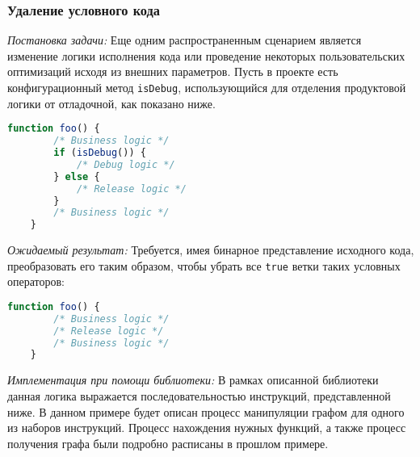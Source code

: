 \subsubsection{Удаление условного кода}

\textit{Постановка задачи:} Еще одним распространенным сценарием является изменение логики исполнения кода или проведение некоторых пользовательских оптимизаций исходя из внешних параметров. Пусть в проекте есть конфигурационный метод \texttt{isDebug}, использующийся для отделения продуктовой логики от отладочной, как показано ниже.

\begin{lstlisting}[language=javascript, label=lst:]
    function foo() {
        /* Business logic */
        if (isDebug()) {
            /* Debug logic */
        } else {
            /* Release logic */
        }
        /* Business logic */
    }
\end{lstlisting}

\textit{Ожидаемый результат:} Требуется, имея бинарное представление исходного кода, преобразовать его таким образом, чтобы убрать все \texttt{true} ветки таких условных операторов:

\begin{lstlisting}[language=javascript, label=lst:]
    function foo() {
        /* Business logic */
        /* Release logic */
        /* Business logic */
    }
\end{lstlisting}

\textit{Имплементация при помощи библиотеки:} В рамках описанной библиотеки данная логика выражается последовательностью инструкций, представленной ниже. В данном примере будет описан процесс манипуляции графом для одного из наборов инструкций. Процесс нахождения нужных функций, а также процесс получения графа были подробно расписаны в прошлом примере.

